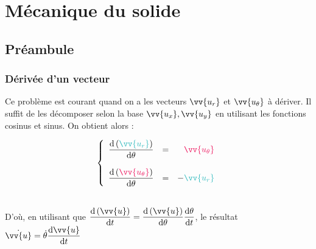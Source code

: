 \documentclass[11pt,a4paper,fleqn,pdftex]{report}
\begin{document}
\chapter{Mécanique du solide}
\section{Préambule}
\subsection{Dérivée d'un vecteur}
Ce problème est courant quand on a les vecteurs $\vv{u_r}$ et $\vv{u_\theta}$ à dériver. Il suffit de les décomposer selon la base $\vv{u_x},\vv{u_y}$ en utilisant les fonctions cosinus et sinus. On obtient alors :\\
\begin{minipage}{6cm}%
\begin{equation}\label{dUr_dUthehta}
\left\lbrace
\begin{array}{r c r}
\dfrac{\d\left(\textcolor{Aquamarine}{\vv{u_r}}\right)}{\d\theta}&=&\textcolor{OrangeRed}{\vv{u_\theta}}\\
\\
\dfrac{\d\left(\textcolor{OrangeRed}{\vv{u_\theta}}\right)}{\d\theta}&=&-\textcolor{Aquamarine}{\vv{u_r}}\\
\end{array}
\right.
\end{equation}
\end{minipage}
\begin{minipage}{6cm}%
\end{minipage}
\\
D'où, en utilisant que $
\dfrac{\d \left(\vv{u}\right)}{\d t}=\dfrac{\d \left(\vv{u}\right)}{\d \theta}\dfrac{\d \theta}{\d t}$, le résultat $\dot{\vv{u}}=\dot{\theta}\der{\vv{u}}{t}$
%
\end{document}
